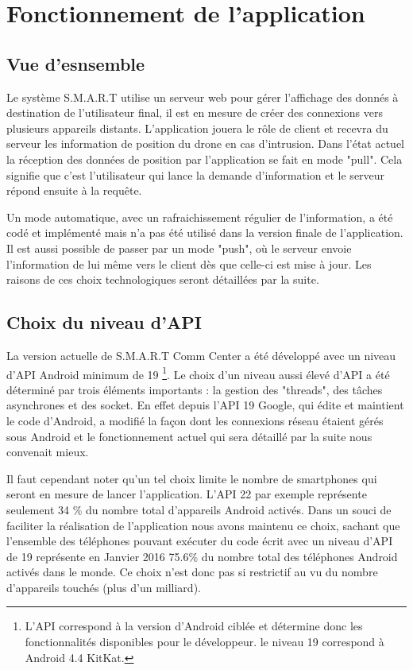 \section{Fonctionnement de l'application}

\subsection{Vue d'esnsemble}

	Le système S.M.A.R.T utilise un serveur web pour gérer l'affichage des donnés à destination de l'utilisateur final, il est en mesure de créer des connexions vers plusieurs appareils distants. L'application jouera le rôle de client et recevra du serveur les information de position du drone en cas d'intrusion. Dans l'état actuel la réception des données de position par l'application se fait en mode "pull". Cela signifie que c'est l'utilisateur qui lance la demande d'information et le serveur répond ensuite à la requête.
	
	Un mode automatique, avec un rafraichissement régulier de l'information, a été codé et implémenté mais n'a pas été utilisé dans la version finale de l'application. Il est aussi possible de passer par un mode "push", où le serveur envoie l'information de lui même vers le client dès que celle-ci est mise à jour. Les raisons de ces choix technologiques seront détaillées par la suite.


\subsection{Choix du niveau d'API}

	La version actuelle de S.M.A.R.T Comm Center a été développé avec un niveau d'API Android minimum de 19 \footnote{L'API correspond à la version d'Android ciblée et détermine donc les fonctionnalités disponibles pour le développeur. le niveau 19 correspond à Android 4.4 KitKat.}. Le choix d'un niveau aussi élevé d'API a été déterminé par trois éléments importants : la gestion des "threads", des tâches asynchrones et des socket. En effet depuis l'API 19 Google, qui édite et maintient le code d'Android, a modifié la façon dont les connexions réseau étaient gérés sous Android et le fonctionnement actuel qui sera détaillé par la suite nous convenait mieux. 
	
	Il faut cependant noter qu'un tel choix limite le nombre de smartphones qui seront en mesure de lancer l'application. L'API 22 par exemple représente seulement 34 \% du nombre total d'appareils Android activés. Dans un souci de faciliter la réalisation de l'application nous avons maintenu ce choix, sachant que l'ensemble des téléphones pouvant exécuter du code écrit avec un niveau d'API de 19 représente en Janvier 2016 75.6\% du nombre total des téléphones Android activés dans le monde. Ce choix n'est donc pas si restrictif au vu du nombre d'appareils touchés (plus d'un milliard).

